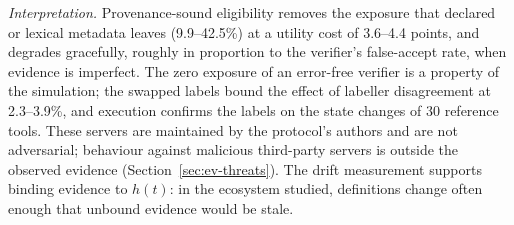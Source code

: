 \emph{Interpretation.} Provenance-sound eligibility removes the exposure that declared or lexical metadata
leaves (9.9--42.5\%) at a utility cost of 3.6--4.4 points, and degrades gracefully, roughly in proportion to the
verifier's false-accept rate, when evidence is imperfect. The zero exposure of an error-free verifier is a
property of the simulation; the swapped labels bound the effect of labeller disagreement at 2.3--3.9\%, and
execution confirms the labels on the state changes of 30 reference tools. These servers are maintained by the
protocol's authors and are not adversarial; behaviour against malicious third-party servers is outside the
observed evidence (Section~\ref{sec:ev-threats}). The drift measurement supports binding evidence to $h(t)$:
in the ecosystem studied, definitions change often enough that unbound evidence would be stale.
